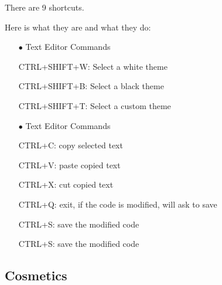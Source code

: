 \documentclass[a4paper,12pt]{article}
\begin{document}
There are 9 shortcuts.

Here is what they are and what they do:

\begin{itemize}
	\setlength{\itemindent}{1em}
	\item[$\bullet$] Text Editor Commands
	\setlength{\itemindent}{3em}
		\item[\ding{118}] CTRL+SHIFT+W: Select a white theme
		\item[\ding{118}] CTRL+SHIFT+B: Select a black theme
		\item[\ding{118}] CTRL+SHIFT+T: Select a custom theme

	\setlength{\itemindent}{1em}
	\item[$\bullet$] Text Editor Commands
	\setlength{\itemindent}{3em}
		\item[\ding{118}] CTRL+C: copy selected text
		\item[\ding{118}] CTRL+V: paste copied text
		\item[\ding{118}] CTRL+X: cut copied text
		\item[\ding{118}] CTRL+Q: exit, if the code is modified, will ask to save
		\item[\ding{118}] CTRL+S: save the modified code
		\item[\ding{118}] CTRL+S: save the modified code
\end{itemize}


\subsection{Cosmetics}\label{cosmetics}


\end{document}
